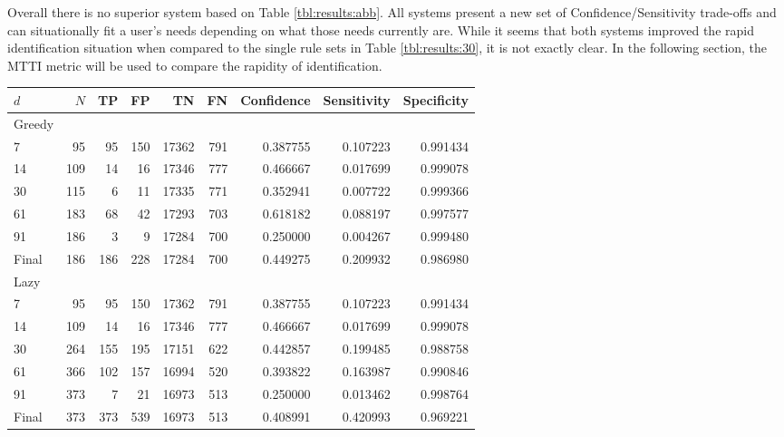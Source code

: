 Overall there is no superior system based on Table \ref{tbl:results:abb}. All systems present a new set of Confidence/Sensitivity trade-offs and can situationally fit a user's needs depending on what those needs currently are. While it seems that both systems improved the rapid identification situation when compared to the single rule sets in Table \ref{tbl:results:30}, it is not exactly clear. In the following section, the MTTI metric will be used to compare the rapidity of identification.

\begin{table}[h]
	\centering

	\begin{tabular}{lrrrrrrrr}
	\toprule
	{$d$} &    $N$ &   TP &   FP &     TN &   FN &  Confidence &  Sensitivity &  Specificity \\
	\midrule
	\toprule
	Greedy & & & & & & & & \\
	\midrule
	7     &   95 &   95 &  150 &  17362 &  791 &    0.387755 &     0.107223 &     0.991434 \\
	14    &  109 &   14 &   16 &  17346 &  777 &    0.466667 &     0.017699 &     0.999078 \\
	30    &  115 &    6 &   11 &  17335 &  771 &    0.352941 &     0.007722 &     0.999366 \\
	61    &  183 &   68 &   42 &  17293 &  703 &    0.618182 &     0.088197 &     0.997577 \\
	91    &  186 &    3 &    9 &  17284 &  700 &    0.250000 &     0.004267 &     0.999480 \\
	Final &  186 &  186 &  228 &  17284 &  700 &    0.449275 &     0.209932 &     0.986980 \\
	\bottomrule
	\toprule
	Lazy & & & & & & & & \\
	\midrule
	7     &   95 &   95 &  150 &  17362 &  791 &    0.387755 &     0.107223 &     0.991434 \\
	14    &  109 &   14 &   16 &  17346 &  777 &    0.466667 &     0.017699 &     0.999078 \\
	30    &  264 &  155 &  195 &  17151 &  622 &    0.442857 &     0.199485 &     0.988758 \\
	61    &  366 &  102 &  157 &  16994 &  520 &    0.393822 &     0.163987 &     0.990846 \\
	91    &  373 &    7 &   21 &  16973 &  513 &    0.250000 &     0.013462 &     0.998764 \\
	Final &  373 &  373 &  539 &  16973 &  513 &    0.408991 &     0.420993 &     0.969221 \\

\end{tabular}
\end{table}
